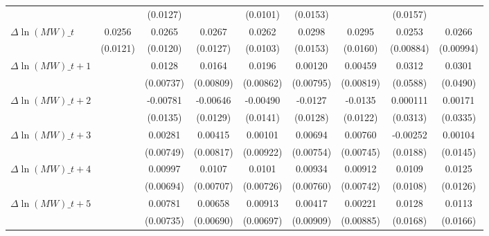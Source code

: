 {\begin{tabular}{l*{8}{c}}
          &                  & (0.0127)         &                  & (0.0101)         & (0.0153)         &                  & (0.0157)         &                  \\
[1em]
$\Delta \ln(MW)\_{t}$&   0.0256\sym{**} &   0.0265\sym{**} &   0.0267\sym{**} &   0.0262\sym{**} &   0.0298\sym{*}  &   0.0295\sym{*}  &   0.0253\sym{***}&   0.0266\sym{**} \\
          & (0.0121)         & (0.0120)         & (0.0127)         & (0.0103)         & (0.0153)         & (0.0160)         &(0.00884)         &(0.00994)         \\
[1em]
$\Delta \ln(MW)\_{t+1}$&                  &   0.0128\sym{*}  &   0.0164\sym{**} &   0.0196\sym{**} &  0.00120         &  0.00459         &   0.0312         &   0.0301         \\
          &                  &(0.00737)         &(0.00809)         &(0.00862)         &(0.00795)         &(0.00819)         & (0.0588)         & (0.0490)         \\
[1em]
$\Delta \ln(MW)\_{t+2}$&                  & -0.00781         & -0.00646         & -0.00490         &  -0.0127         &  -0.0135         & 0.000111         &  0.00171         \\
          &                  & (0.0135)         & (0.0129)         & (0.0141)         & (0.0128)         & (0.0122)         & (0.0313)         & (0.0335)         \\
[1em]
$\Delta \ln(MW)\_{t+3}$&                  &  0.00281         &  0.00415         &  0.00101         &  0.00694         &  0.00760         & -0.00252         &  0.00104         \\
          &                  &(0.00749)         &(0.00817)         &(0.00922)         &(0.00754)         &(0.00745)         & (0.0188)         & (0.0145)         \\
[1em]
$\Delta \ln(MW)\_{t+4}$&                  &  0.00997         &   0.0107         &   0.0101         &  0.00934         &  0.00912         &   0.0109         &   0.0125         \\
          &                  &(0.00694)         &(0.00707)         &(0.00726)         &(0.00760)         &(0.00742)         & (0.0108)         & (0.0126)         \\
[1em]
$\Delta \ln(MW)\_{t+5}$&                  &  0.00781         &  0.00658         &  0.00913         &  0.00417         &  0.00221         &   0.0128         &   0.0113         \\
          &                  &(0.00735)         &(0.00690)         &(0.00697)         &(0.00909)         &(0.00885)         & (0.0168)         & (0.0166)         \\

\end{tabular}}
